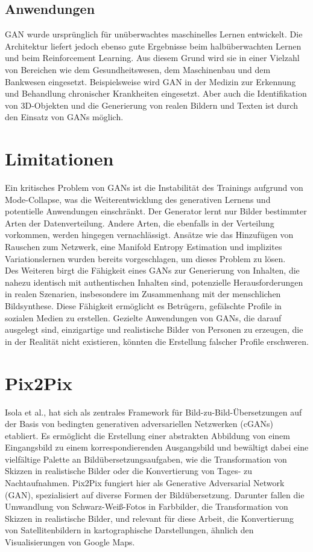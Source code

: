 \subsection*{Anwendungen}
GAN wurde ursprünglich für unüberwachtes maschinelles Lernen entwickelt. Die Architektur liefert jedoch ebenso gute Ergebnisse beim halbüberwachten Lernen und beim Reinforcement Learning\cite{Aggarwal.2021}. 
Aus diesem Grund wird sie in einer Vielzahl von Bereichen wie dem Gesundheitswesen, dem Maschinenbau und dem Bankwesen eingesetzt. Beispielsweise wird GAN in der Medizin zur Erkennung und Behandlung chronischer Krankheiten eingesetzt. Aber auch die Identifikation von 3D-Objekten und die Generierung von realen Bildern und Texten ist durch den Einsatz von GANs möglich.

\section*{Limitationen}
Ein kritisches Problem von GANs ist die Instabilität des Trainings aufgrund von Mode-Collapse, was die Weiterentwicklung des generativen Lernens und potentielle Anwendungen einschränkt\cite{Liu.2022}. Der Generator lernt nur Bilder bestimmter Arten der Datenverteilung.  Andere Arten, die ebenfalls in der Verteilung vorkommen, werden hingegen vernachlässigt\cite{Srivastava.2017}. Ansätze wie das Hinzufügen von Rauschen zum Netzwerk, eine Manifold Entropy Estimation \cite{Liu.2022} und implizites Variationslernen \cite{Srivastava.2017} wurden bereits vorgeschlagen, um dieses Problem zu lösen.\\
Des Weiteren birgt die Fähigkeit eines GANs zur Generierung von Inhalten, die nahezu identisch mit authentischen Inhalten sind, potenzielle Herausforderungen in realen Szenarien, insbesondere im Zusammenhang mit der menschlichen Bildsynthese. Diese Fähigkeit ermöglicht es Betrügern, gefälschte Profile in sozialen Medien zu erstellen. Gezielte Anwendungen von GANs, die darauf ausgelegt sind, einzigartige und realistische Bilder von Personen zu erzeugen, die in der Realität nicht existieren, könnten die Erstellung falscher Profile erschweren\cite{Aggarwal.2021}.


\section{Pix2Pix}
Isola et al., hat sich als zentrales Framework für Bild-zu-Bild-Übersetzungen auf der Basis von bedingten generativen adversariellen Netzwerken (cGANs) etabliert. Es ermöglicht die Erstellung einer abstrakten Abbildung von einem Eingangsbild zu einem korrespondierenden Ausgangsbild und bewältigt dabei eine vielfältige Palette an Bildübersetzungsaufgaben, wie die Transformation von Skizzen in realistische Bilder oder die Konvertierung von Tages- zu Nachtaufnahmen. \newline
Pix2Pix fungiert hier als Generative Adversarial Network (GAN), spezialisiert auf diverse Formen der Bildübersetzung. Darunter fallen die Umwandlung von Schwarz-Weiß-Fotos in Farbbilder, die Transformation von Skizzen in realistische Bilder, und relevant für diese Arbeit, die Konvertierung von Satellitenbildern in kartographische Darstellungen, ähnlich den Visualisierungen von Google Maps.
  

